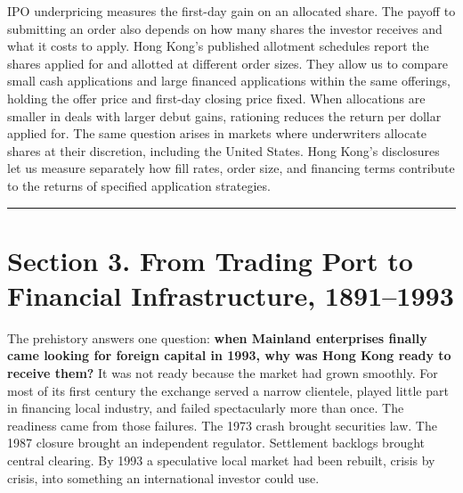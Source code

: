 \documentclass[11pt,letterpaper]{article}
\begin{document}
IPO underpricing measures the first-day gain on an allocated share. The payoff to submitting an order also depends on how many shares the investor receives and what it costs to apply. Hong Kong’s published allotment schedules report the shares applied for and allotted at different order sizes. They allow us to compare small cash applications and large financed applications within the same offerings, holding the offer price and first-day closing price fixed. When allocations are smaller in deals with larger debut gains, rationing reduces the return per dollar applied for. The same question arises in markets where underwriters allocate shares at their discretion, including the United States. Hong Kong’s disclosures let us measure separately how fill rates, order size, and financing terms contribute to the returns of specified application strategies.

\par\medskip\noindent\rule{\linewidth}{0.35pt}\par\medskip
\section*{\texorpdfstring{Section 3. From Trading Port to Financial Infrastructure, 1891–1993}{Section 3. From Trading Port to Financial Infrastructure, 1891–1993}}
The prehistory answers one question: \textbf{when Mainland enterprises finally came looking for foreign capital in 1993, why was Hong Kong ready to receive them?} It was not ready because the market had grown smoothly. For most of its first century the exchange served a narrow clientele, played little part in financing local industry, and failed spectacularly more than once. The readiness came from those failures. The 1973 crash brought securities law. The 1987 closure brought an independent regulator. Settlement backlogs brought central clearing. By 1993 a speculative local market had been rebuilt, crisis by crisis, into something an international investor could use.
\end{document}
